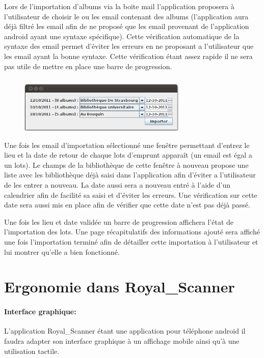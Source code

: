 \documentclass[etudiants]{support-iutrs}
\begin{document}
Lors de l'importation d'albums via la boite mail l'application proposera à l'utilisateur de choisir le ou les email contenant des albums (l'application aura déjà filtré les email afin de ne proposé que les email provenant de l'application android ayant une syntaxe spécifique). 
Cette vérification automatique de la syntaxe des email permet d'éviter les erreurs en ne proposant a l’utilisateur que les email ayant la bonne syntaxe.
Cette vérification étant assez rapide il ne sera pas utile de mettre en place une barre de progression.
\subparagraph{}

\begin{figure}
\includegraphics[width=8cm]{img/ajout_import.png}
\end{figure}
Une fois les email d'importation sélectionné une fenêtre permettant d'entrez le lieu et la date de retour de chaque lots d'emprunt apparaît (un email est égal a un lots).
Le champs de la bibliothèque de cette fenêtre à nouveau propose une liste avec les bibliothèque déjà saisi dans l’application afin d’éviter a l’utilisateur de les entrer a nouveau.
La date aussi sera a nouveau entré à l'aide d'un calendrier afin de facilité sa saisi et d'éviter les erreurs. 
Une vérification sur cette date sera aussi mis en place afin de vérifier que cette date n'est pas déjà passé.

Une fois les lieu et date validée un barre de progression affichera l’état de l'importation des lots. 
Une page récapitulatifs des informations ajouté sera affiché une fois l'importation terminé afin de détailler cette importation à l'utilisateur et lui montrer qu'elle a bien fonctionné.
 


\section{Ergonomie dans Royal\_Scanner}
\paragraph{Interface graphique:}
L'application Royal\_Scanner étant une application pour téléphone android il faudra adapter son interface graphique à un affichage mobile ainsi qu'à une utilisation tactile.
\end{document}
